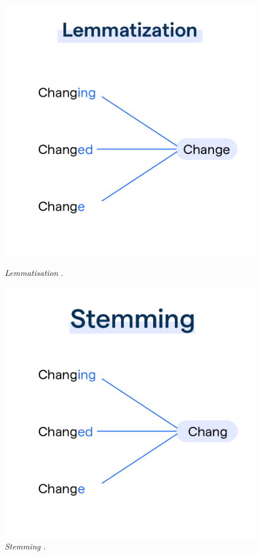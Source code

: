 \begin{figure}[h]
    \centering
    \begin{minipage}{0.45\textwidth}
        \centering
        \includegraphics[width=\textwidth]{figures/Lemmatization_5338fc7c3e.png}
        \caption{\textit{Lemmatisation} \cite{botpenguinLemmatization}.}
        \label{fig:figureL}
    \end{minipage}\hfill
    \begin{minipage}{0.45\textwidth}
        \centering
        \includegraphics[width=\textwidth]{figures/Stemming_53678d43bc.png}
        \caption{\textit{Stemming }\cite{botpenguinLemmatization}.}
        \label{fig:figureS}
    \end{minipage}
\end{figure}

